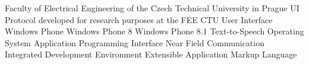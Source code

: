  Faculty of Electrical Engineering of the Czech Technical University in Prague
\abbrv[UIP]  UI Protocol developed for research purposes at the FEE CTU
\abbrv[UI]  User Interface
\abbrv[WP] Windows Phone
\abbrv[WP8] Windows Phone 8
\abbrv[WP8.1] Windows Phone 8.1
\abbrv[TTS]  Text-to-Speech
\abbrv[OS]  Operating System
\abbrv[API]  Application Programming Interface
\abbrv[NFC]  Near Field Communication
\abbrv[IDE]  Integrated Development Environment
\abbrv[XAML] Extensible Application Markup Language
\stopAbbreviations

\endinput
